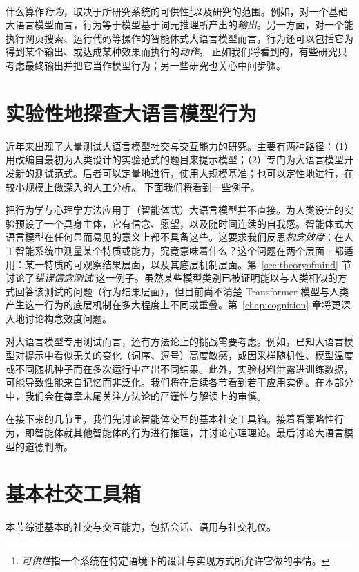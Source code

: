 什么算作\emph{行为}，取决于所研究系统的可供性\footnote{{\em 可供性}指一个系统在特定语境下的设计与实现方式所允许它做的事情。}以及研究的范围。例如，对一个基础大语言模型而言，行为等于模型基于词元推理所产出的{\em 输出}。另一方面，对一个能执行网页搜索、运行代码等操作的智能体式大语言模型而言，行为还可以包括它为得到某个输出、或达成某种效果而执行的{\em 动作}。
正如我们将看到的，有些研究只考虑最终输出并把它当作模型行为；另一些研究也关心中间步骤。

\section{实验性地探查大语言模型行为}
近年来出现了大量测试大语言模型社交与交互能力的研究。主要有两种路径：（1）用改编自最初为人类设计的实验范式的题目来提示模型；（2）专门为大语言模型开发新的测试范式。后者可以定量地进行，使用大规模基准；也可以定性地进行，在较小规模上做深入的人工分析。
下面我们将看到一些例子。

把行为学与心理学方法应用于（智能体式）大语言模型并不直接。为人类设计的实验预设了一个具身主体，它有信念、愿望，以及随时间连续的自我感。智能体式大语言模型在任何显而易见的意义上都不具备这些。这要求我们反思\emph{构念效度}：在人工智能系统中测量某个特质或能力，究竟意味着什么？这个问题在两个层面上都适用：某一特质的可观察结果层面，以及其底层机制层面。第~\ref{sec:theoryofmind} 节讨论了{\em 错误信念测试} \citep{carpenter2002new} 这一例子。虽然某些模型类别已被证明能以与人类相似的方式回答该测试的问题（行为结果层面），但目前尚不清楚 Transformer 模型与人类产生这一行为的底层机制在多大程度上不同或重叠。第~\ref{chap:cognition} 章将更深入地讨论构念效度问题。%

对大语言模型专用测试而言，还有方法论上的挑战需要考虑。例如，已知大语言模型对提示中看似无关的变化（词序、逗号）高度敏感，或因采样随机性、模型温度或不同随机种子而在多次运行中产出不同结果。此外，实验材料泄露进训练数据，可能导致性能来自记忆而非泛化。我们将在后续各节看到若干应用实例。在本部分中，我们会在每章末尾关注方法论的严谨性与解读上的审慎。

在接下来的几节里，我们先讨论智能体交互的基本社交工具箱。接着看策略性行为，即智能体就其他智能体的行为进行推理，并讨论心理理论。最后讨论大语言模型的道德判断。

\section{基本社交工具箱}
本节综述基本的社交与交互能力，包括会话、语用与社交礼仪。

